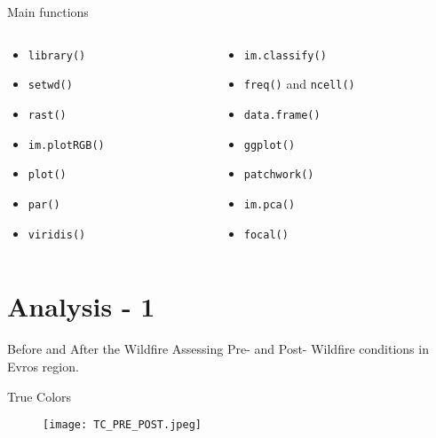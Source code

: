 \documentclass{beamer}
\begin{document}
\begin{frame}{Main functions}
\bigskip
\begin{columns}
    \begin{column}{0.5\textwidth}
    \begin{itemize}
        \item    \texttt{library()} 
        \item    \texttt{setwd()} 
        \item    \texttt{rast()} 
        \item    \texttt{im.plotRGB()}
        \item    \texttt{plot()}
        \item    \texttt{par()}
        \item    \texttt{viridis()}
    \end{itemize}
    \end{column}
    \begin{column}{0.5\textwidth}  
     \begin{itemize}
        \item    \texttt{im.classify()}
        \item    \texttt{freq()} and \texttt{ncell()}
        \item    \texttt{data.frame()}
        \item    \texttt{ggplot()}
        \item    \texttt{patchwork()}
        \item    \texttt{im.pca()} 
        \item    \texttt{focal()}
        \end{itemize}
    \end{column}
\end{columns}
\end{frame}

\section{Analysis - 1} 
\begin{frame}{Before and After the Wildfire}
\centering
Assessing Pre- and Post- Wildfire conditions in Evros region. 

\bigskip

\centering True Colors

\begin{figure}
    \centering
    \texttt{[image: TC\_PRE\_POST.jpeg]}
\end{figure}
\end{frame}
\end{document}
